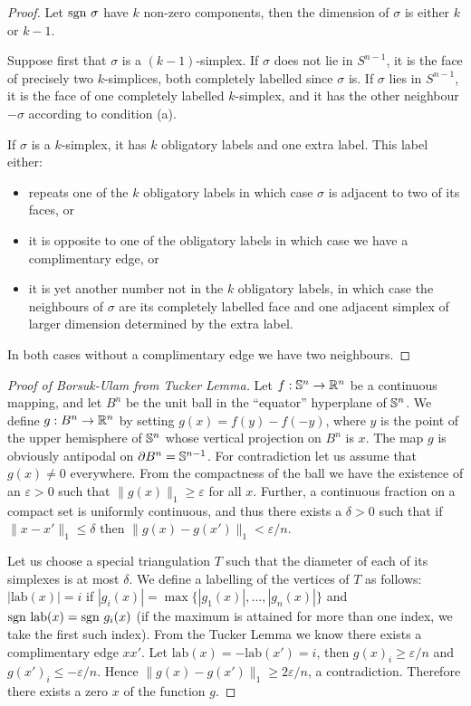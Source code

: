 \begin{proof}
    Let $\text{sgn } \sigma$ have $k$ non-zero components, then the dimension of $\sigma$ is either $k$ or $k-1$. 

    Suppose first that $\sigma$ is a $(k-1)$-simplex. If $\sigma$ does not lie in $S^{n-1}$, it is the face of precisely two $k$-simplices, both completely labelled since $\sigma$ is.  If $\sigma$ lies in $S^{n-1}$, it is the face of one completely labelled $k$-simplex, and it has the other neighbour $-\sigma$ according to condition (a).

    If $\sigma$ is a $k$-simplex, it has $k$ obligatory labels and one extra label. This label either:
    \begin{itemize}
        \item repeats one of the $k$ obligatory labels in which case $\sigma$ is adjacent to two of its faces, or
        \item it is opposite to one of the obligatory labels in which case we have a complimentary edge, or \item it is yet another number not in the $k$ obligatory labels, in which case the neighbours of $\sigma$ are its completely labelled face and one adjacent simplex of larger dimension determined by the extra label. 
    \end{itemize}
    In both cases without a complimentary edge we have two neighbours.
\end{proof}

\begin{proof}[Proof of Borsuk-Ulam from Tucker Lemma]
    Let $f: \mathbb S^n \to \mathbb R^n$ be a continuous mapping, and let $B^n$ be the unit ball in the ``equator'' hyperplane of $\mathbb S^n$. We define $g: B^n \to \mathbb R^n$ by setting $g(x) = f(y) - f(-y)$, where $y$ is the point of the upper hemisphere of $\mathbb S^n$ whose vertical projection on $B^n$ is $x$. The map $g$ is obviously antipodal on $\partial B^n = \mathbb S^{n-1}$. For contradiction let us assume that $g(x) \neq 0$ everywhere. From the compactness of the ball we have the existence of an $\varepsilon > 0$ such that $\|g(x)\|_1 \geq \varepsilon$ for all $x$. Further, a continuous fraction on a compact set is uniformly continuous, and thus there exists a $\delta > 0$ such that if $\| x - x' \|_1 \leq \delta$ then $\|g(x) - g(x')\|_1 < \varepsilon/n$.
    
    Let us choose a special triangulation $T$ such that the diameter of each of its simplexes is at most $\delta$. We define a labelling of the vertices of $T$ as follows: $|\text{lab}(x)| = i$ if $|g_i(x)| = \max \{|g_1(x)|, \dots, |g_n(x)| \}$ and $\text{sgn } \text{lab} (x) = \text{sgn } g_i(x)$ (if the maximum is attained for more than one index, we take the first such index). From the Tucker Lemma we know there exists a complimentary edge $xx'$. Let $\text{lab}(x) = -\text{lab}(x') = i$, then $g(x)_i \geq \varepsilon/n$ and $g(x')_i \leq -\varepsilon/n$. Hence $\|g(x) - g(x') \|_1 \geq 2\varepsilon / n$, a contradiction. Therefore there exists a zero $x$ of the function $g$.
\end{proof}
